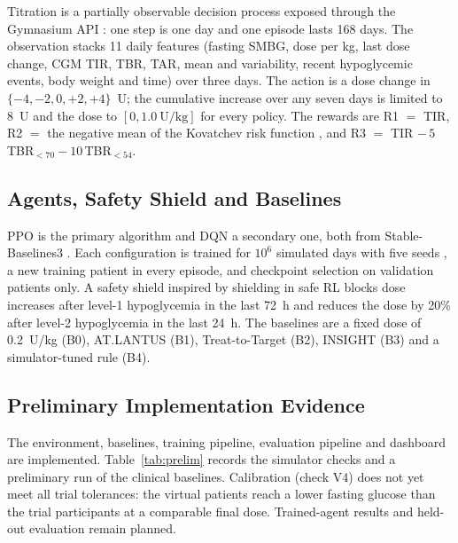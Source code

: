 \documentclass[conference]{IEEEtran}
\begin{document}
Titration is a partially observable decision process exposed through the Gymnasium API
\cite{towers2025}: one step is one day and one episode lasts 168 days. The observation stacks
11 daily features (fasting SMBG, dose per kg, last dose change, CGM TIR, TBR, TAR, mean and
variability, recent hypoglycemic events, body weight and time) over three days. The action is a
dose change in $\{-4,-2,0,+2,+4\}$~U; the cumulative increase over any seven days is limited to
8~U and the dose to $[0, 1.0~\text{U/kg}]$ for every policy. The rewards are R1 $=$ TIR, R2 $=$
the negative mean of the Kovatchev risk function \cite{kovatchev1997}, and R3 $=$ TIR
$-\,5\,$TBR$_{<70}-10\,$TBR$_{<54}$.

\subsection{Agents, Safety Shield and Baselines}
PPO \cite{schulman2017} is the primary algorithm and DQN \cite{mnih2015} a secondary one, both
from Stable-Baselines3 \cite{raffin2021}. Each configuration is trained for $10^6$ simulated days
with five seeds \cite{henderson2018}, a new training patient in every episode, and checkpoint
selection on validation patients only. A safety shield inspired by shielding in safe RL
\cite{alshiekh2018} blocks dose increases after level-1 hypoglycemia in the last 72~h and reduces
the dose by 20\% after level-2 hypoglycemia in the last 24~h. The baselines are a fixed dose of
0.2~U/kg (B0), AT.LANTUS (B1), Treat-to-Target (B2), INSIGHT (B3) and a simulator-tuned rule (B4).

\subsection{Preliminary Implementation Evidence}
The environment, baselines, training pipeline, evaluation pipeline and dashboard are
implemented. Table~\ref{tab:prelim} records the simulator checks and a preliminary run of the
clinical baselines. Calibration (check V4) does not yet meet all trial tolerances: the virtual
patients reach a lower fasting glucose than the trial participants at a comparable final dose.
Trained-agent results and held-out evaluation remain planned.
\end{document}

